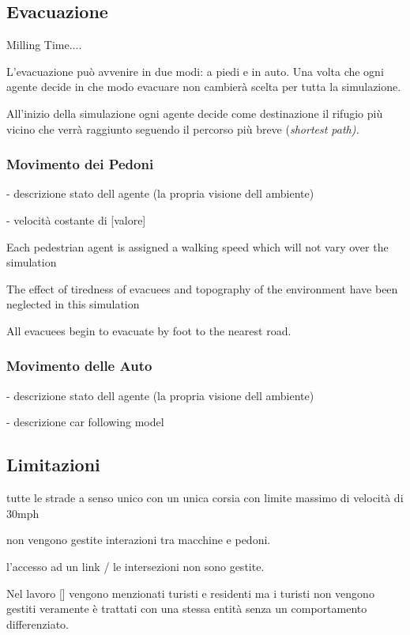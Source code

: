 \subsection{Evacuazione}


Milling Time....

L'evacuazione può avvenire in due modi: a piedi e in auto. Una volta che ogni agente decide
in che modo evacuare non cambierà scelta per tutta la simulazione.

All'inizio della simulazione ogni agente decide come destinazione il rifugio più vicino 
che verrà raggiunto seguendo il percorso più breve (\it{shortest path}).


\subsubsection{Movimento dei Pedoni}
- descrizione stato dell agente (la propria visione dell ambiente)

- velocità costante di [valore]

Each pedestrian agent is assigned a
walking speed which will not vary over the simulation

The effect of tiredness of evacuees and topography of the
environment have been neglected in this simulation

All evacuees begin to evacuate by
foot to the nearest road.

\subsubsection{Movimento delle Auto}
- descrizione stato dell agente (la propria visione dell ambiente)

- descrizione car following model

\subsection{Limitazioni}

tutte le strade a senso unico con un unica corsia
con limite massimo di velocità di 30mph

non vengono gestite interazioni tra macchine e pedoni.

l'accesso ad un link / le intersezioni non sono gestite.

Nel lavoro [] vengono menzionati turisti e residenti
ma i turisti non vengono gestiti veramente è trattati
con una stessa entità senza un comportamento differenziato.
